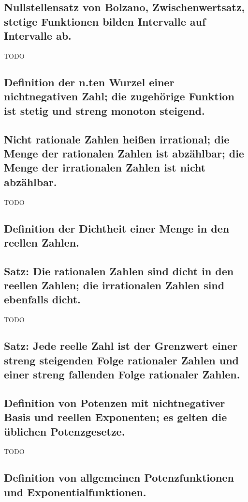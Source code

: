 \subsection{Nullstellensatz von Bolzano, Zwischenwertsatz, stetige Funktionen bilden Intervalle auf Intervalle ab.}

TODO

\subsection{Definition der n.ten Wurzel einer nichtnegativen Zahl; die zugehörige Funktion ist stetig und streng monoton steigend.}

\subsection{Nicht rationale Zahlen heißen irrational; die Menge der rationalen Zahlen ist abzählbar; die Menge der irrationalen Zahlen ist nicht abzählbar.} 

TODO

\subsection{Definition der Dichtheit einer Menge in den reellen Zahlen.}

\subsection{Satz: Die rationalen Zahlen sind dicht in den reellen Zahlen; die irrationalen Zahlen sind ebenfalls dicht.}

TODO

\subsection{Satz: Jede reelle Zahl ist der Grenzwert einer streng steigenden Folge rationaler Zahlen und einer streng fallenden Folge rationaler Zahlen.} 

\subsection{Definition von Potenzen mit nichtnegativer Basis und reellen Exponenten; es gelten die üblichen Potenzgesetze.}

TODO

\subsection{Definition von allgemeinen Potenzfunktionen und Exponentialfunktionen.}


